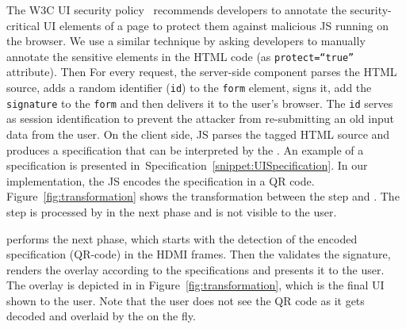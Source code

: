  The W3C UI security policy~\cite{w3c_spec} recommends developers to annotate the security-critical UI elements of a page to protect them against malicious JS running on the browser. We use a similar technique by asking developers to manually annotate the sensitive elements in the HTML code (as \texttt{protect=``true''} attribute). Then For every request, the \name server-side component parses the HTML source, adds a random identifier (\texttt{id}) to the \texttt{form} element, signs it, add the \texttt{signature} to the \texttt{form} and then delivers it to the user's browser. The \texttt{id} serves as session identification to prevent the attacker from re-submitting an old input data from the user. On the client side, \name JS parses the tagged HTML source and produces a specification that can be interpreted by the \device.  An example of a specification is presented in~Specification~\ref{snippet:UISpecification}. In our implementation, the \name JS encodes the specification in a QR code.  Figure~\ref{fig:transformation} shows the transformation between the step \one and \two. The step \two is processed by \device in the next phase and is not visible to the user.




 \device performs the next phase, which starts with the detection of the encoded specification (QR-code) in the HDMI frames. Then the \device validates the signature, renders the overlay according to the specifications and presents it to the user.  The \device overlay is depicted in \three in Figure~\ref{fig:transformation}, which is the final UI shown to the user. Note that the user does not see the QR code as it gets decoded and overlaid by the \device on the fly.

